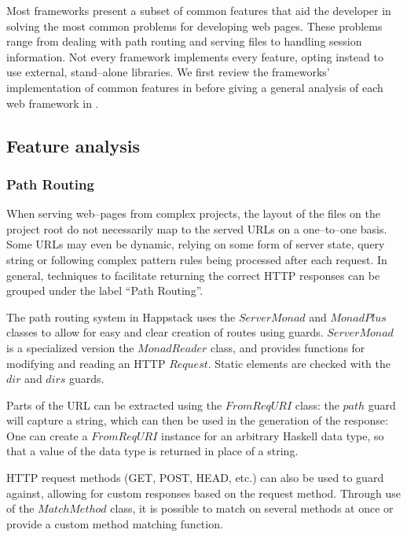 Most frameworks present a subset of common features that aid the developer in solving the most common problems for developing web pages.
These problems range from dealing with path routing and serving files to handling session information.
Not every framework implements every feature, opting instead to use external, stand--alone libraries.
We first review the frameworks' implementation of common features in  before giving a general analysis of each web framework in .

\subsection{Feature analysis}\label{featureanalysis}

\subsubsection{Path Routing}\label{pathrouting}

When serving web--pages from complex projects, the layout of the files on the project root do not necessarily map to the served URLs on a one--to--one basis.
Some URLs may even be dynamic, relying on some form of server state, query string or following complex pattern rules being processed after each request.
In general, techniques to facilitate returning the correct HTTP responses can be grouped under the label ``Path Routing''.

The path routing system in Happstack uses the $ ServerMonad $ and $ MonadPlus $ classes to allow for easy and clear creation of routes using guards.
$ ServerMonad $ is a specialized version the $ MonadReader $ class, and provides functions for modifying and reading an HTTP $ Request $.
Static elements are checked with the $ dir $ and $ dirs $ guards.

Parts of the URL can be extracted using the $ FromReqURI $ class: the $ path $ guard will capture a string, which can then be used in the generation of the response:
One can create a $ FromReqURI $ instance for an arbitrary Haskell data type, so that a value of the data type is returned in place of a string.

HTTP request methods (GET, POST, HEAD, etc.) can also be used to guard against, allowing for custom responses based on the request method.
Through use of the $ MatchMethod $ class, it is possible to match on several methods at once or provide a custom method matching function.

